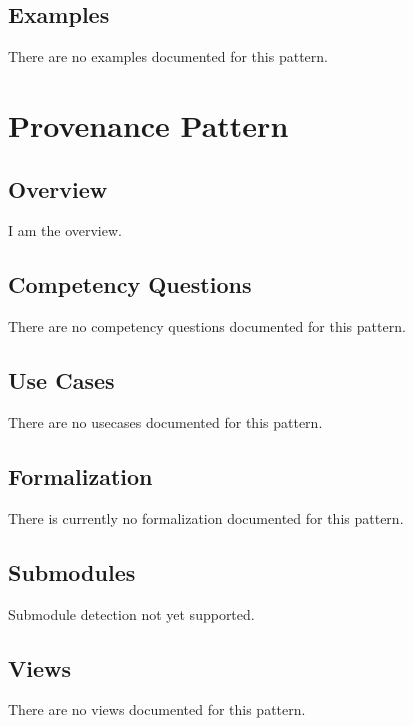 \subsection{Examples}
\label{ssec:examples}
There are no examples documented for this pattern.


\section{Provenance Pattern}
\label{sec:provenance-pattern}
\subsection{Overview}
\label{ssec:overview}
I am the overview.

\subsection{Competency Questions}
\label{ssec:cqs}
There are no competency questions documented for this pattern.

\subsection{Use Cases}
\label{ssec:use-cases}
There are no usecases documented for this pattern.
\subsection{Formalization}
\label{ssec:formalization}
There is currently no formalization documented for this pattern.

\subsection{Submodules}
\label{ssec:submodules}
Submodule detection not yet supported.

\subsection{Views}
\label{ssec:views}
There are no views documented for this pattern.


